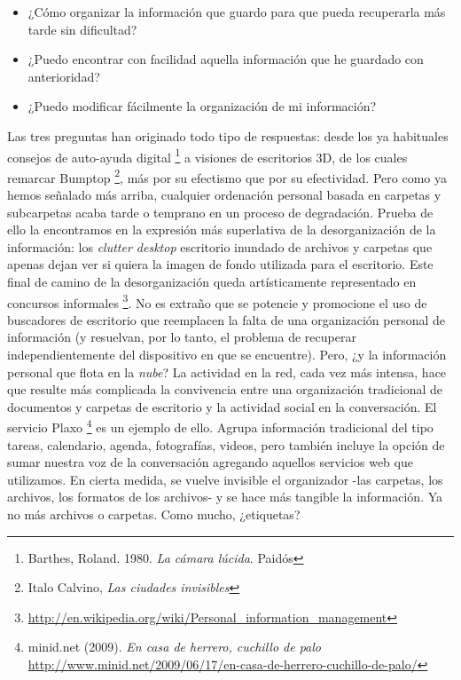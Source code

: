 \documentclass[12pt, a4paper,twoside]{book}
\begin{document}
\begin{itemize}
\item
  ¿Cómo organizar la información que guardo para que pueda
  recuperarla más tarde sin dificultad?
\item
  ¿Puedo encontrar con facilidad aquella información que he guardado
  con anterioridad?
\item
  ¿Puedo modificar fácilmente la organización de mi información?
\end{itemize}
Las tres preguntas han originado todo tipo de respuestas: desde los
ya habituales consejos de auto-ayuda digital%
\footnote{Barthes, Roland. 1980. \emph{La cámara lúcida}. Paidós}
a visiones de escritorios 3D, de los cuales remarcar Bumptop%
\footnote{Italo Calvino, \emph{Las ciudades invisibles}},
más por su efectismo que por su efectividad. Pero como ya hemos
señalado más arriba, cualquier ordenación personal basada en
carpetas y subcarpetas acaba tarde o temprano en un proceso de
degradación. Prueba de ello la encontramos en la expresión más
superlativa de la desorganización de la información: los
\emph{clutter desktop} escritorio inundado de archivos y carpetas
que apenas dejan ver si quiera la imagen de fondo utilizada para el
escritorio. Este final de camino de la desorganización queda
artísticamente representado en concursos informales%
\footnote{\href{http://en.wikipedia.org/wiki/Personal_information_management}{http://en.wikipedia.org/wiki/Personal\_information\_management}}.
No es extraño que se potencie y promocione el uso de buscadores de
escritorio que reemplacen la falta de una organización personal de
información (y resuelvan, por lo tanto, el problema de recuperar
independientemente del dispositivo en que se encuentre). Pero, ¿y
la información personal que flota en la \emph{nube}? La actividad
en la red, cada vez más intensa, hace que resulte más complicada la
convivencia entre una organización tradicional de documentos y
carpetas de escritorio y la actividad social en la conversación. El
servicio Plaxo%
\footnote{minid.net (2009). \emph{En casa de herrero, cuchillo de palo}
\href{http://www.minid.net/2009/06/17/en-casa-de-herrero-cuchillo-de-palo/}{http://www.minid.net/2009/06/17/en-casa-de-herrero-cuchillo-de-palo/}}
es un ejemplo de ello. Agrupa información tradicional del tipo
tareas, calendario, agenda, fotografías, videos, pero también
incluye la opción de sumar nuestra voz de la conversación agregando
aquellos servicios web que utilizamos. En cierta medida, se vuelve
invisible el organizador -las carpetas, los archivos, los formatos
de los archivos- y se hace más tangible la información. Ya no más
archivos o carpetas. Como mucho, ¿etiquetas?
\end{document}
